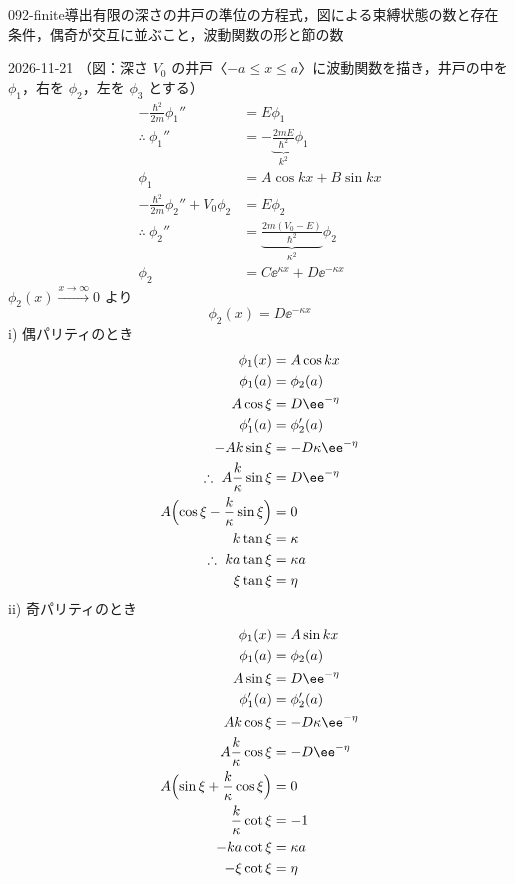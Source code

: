 \documentclass[uplatex,dvipdfmx,a4paper,11pt]{jsarticle}
\begin{document}
\begin{mondai}{092-finite}{導出}{有限の深さの井戸の準位の方程式，図による束縛状態の数と存在条件，偶奇が交互に並ぶこと，波動関数の形と節の数}
\begin{kotaeutsushi}{2026-11-21}
（図：深さ $V_{0}$ の井戸〈$-a\le x\le a$〉に波動関数を描き，井戸の中を $\phi_{1}$，右を $\phi_{2}$，左を $\phi_{3}$ とする）
\begin{align*}
-\frac{\hbar^{2}}{2m}\phi_{1}''&=E\phi_{1}\\
\therefore\ \phi_{1}''&=-\underbrace{\frac{2mE}{\hbar^{2}}}_{k^{2}}\phi_{1}\\
\phi_{1}&=A\cos kx+B\sin kx\\
-\frac{\hbar^{2}}{2m}\phi_{2}''+V_{0}\phi_{2}&=E\phi_{2}\\
\therefore\ \phi_{2}''&=\underbrace{\frac{2m(V_{0}-E)}{\hbar^{2}}}_{\kappa^{2}}\phi_{2}\\
\phi_{2}&=C\ee^{\kappa x}+D\ee^{-\kappa x}
\end{align*}
$\phi_{2}(x)\xrightarrow{x\to\infty}0$ より
\[ \phi_{2}(x)=D\ee^{-\kappa x} \]
i) 偶パリティのとき
\begin{align*}
\phi_{1}(x)&=A\cos kx\\
\phi_{1}(a)&=\phi_{2}(a)\\
A\cos\xi&=D\ee^{-\eta}\\
\phi_{1}'(a)&=\phi_{2}'(a)\\
-Ak\sin\xi&=-D\kappa\ee^{-\eta}\\
\therefore\ A\frac{k}{\kappa}\sin\xi&=D\ee^{-\eta}\\
A\Bigl(\cos\xi-\frac{k}{\kappa}\sin\xi\Bigr)&=0\\
k\tan\xi&=\kappa\\
\therefore\ ka\tan\xi&=\kappa a\\
\xi\tan\xi&=\eta
\end{align*}
ii) 奇パリティのとき
\begin{align*}
\phi_{1}(x)&=A\sin kx\\
\phi_{1}(a)&=\phi_{2}(a)\\
A\sin\xi&=D\ee^{-\eta}\\
\phi_{1}'(a)&=\phi_{2}'(a)\\
Ak\cos\xi&=-D\kappa\ee^{-\eta}\\
A\frac{k}{\kappa}\cos\xi&=-D\ee^{-\eta}\\
A\Bigl(\sin\xi+\frac{k}{\kappa}\cos\xi\Bigr)&=0\\
\frac{k}{\kappa}\cot\xi&=-1\\
-ka\cot\xi&=\kappa a\\
-\xi\cot\xi&=\eta
\end{align*}
\begin{align*}

\end{align*}
\end{kotaeutsushi}
\end{mondai}
\end{document}
